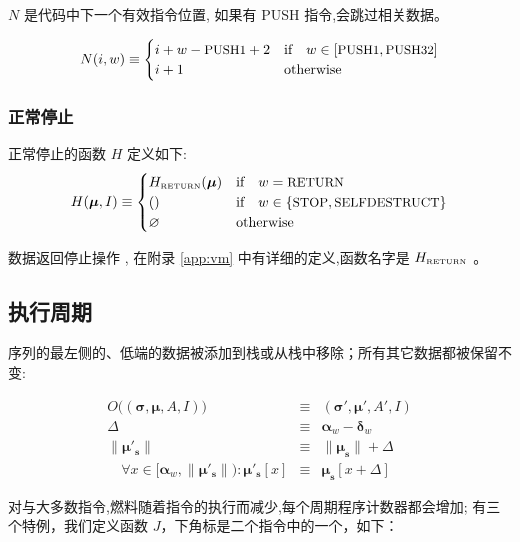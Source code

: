 \documentclass[9pt,oneside]{amsart}
\begin{document}
\begin{multicols}{2}
$N$ 是代码中下一个有效指令位置, 如果有 {\small PUSH} 指令,会跳过相关数据。

\begin{equation}
N(i, w) \equiv \begin{cases}
i + w - \text{\small PUSH1} + 2 & \text{if} \quad w \in [\text{\small PUSH1}, \text{\small PUSH32}] \\
i + 1 & \text{otherwise} \end{cases}
\end{equation}

\subsubsection{正常停止}

正常停止的函数 $H$ 定义如下:
\begin{equation}
H(\boldsymbol{\mu}, I) \equiv \begin{cases}
H_{\text{\tiny RETURN}}(\boldsymbol{\mu}) & \text{if} \quad w = \text{\small RETURN} \\
() & \text{if} \quad w \in \{ \text{\small STOP}, \text{\small SELFDESTRUCT} \} \\
\varnothing & \text{otherwise}
\end{cases}
\end{equation}

数据返回停止操作 , 在附录 \ref{app:vm} 中有详细的定义,函数名字是 $H_{\text{\tiny RETURN}}$ 。

\subsection{执行周期}
序列的最左侧的、低端的数据被添加到栈或从栈中移除；所有其它数据都被保留不变:

\begin{eqnarray}
O\big((\boldsymbol{\sigma}, \boldsymbol{\mu}, A, I)\big) & \equiv & (\boldsymbol{\sigma}', \boldsymbol{\mu}', A', I) \\
\Delta & \equiv & \mathbf{\alpha}_w - \mathbf{\delta}_w \\
\lVert\boldsymbol{\mu}'_\mathbf{s}\rVert & \equiv & \lVert\boldsymbol{\mu}_\mathbf{s}\rVert + \Delta \\
\quad \forall x \in [\mathbf{\alpha}_w, \lVert\boldsymbol{\mu}'_\mathbf{s}\rVert): \boldsymbol{\mu}'_\mathbf{s}[x] & \equiv & \boldsymbol{\mu}_\mathbf{s}[x+\Delta]
\end{eqnarray}

对与大多数指令,燃料随着指令的执行而减少,每个周期程序计数器都会增加; 有三个特例，我们定义函数  $J$，下角标是二个指令中的一个，如下：


\end{multicols}
\end{document}
